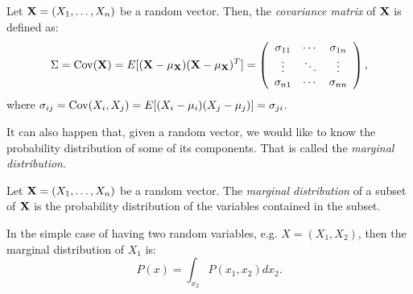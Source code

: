 \begin{ndef}
Let $\mathbf{X} = (X_1,\dots,X_n)$ be a random vector. Then, the \emph{covariance matrix} of $\mathbf{X}$ is defined as:
$$
\Sigma = \operatorname*{Cov}(\mathbf{X}) = E[(\mathbf{X} - \mu_{\mathbf{X}})(\mathbf{X} - \mu_{\mathbf{X}})^T] = \left ( \begin{array}{ccc} 
  \sigma_{11} & \cdots & \sigma_{1n}\\
  \vdots & \ddots & \vdots \\
  \sigma_{n1} & \cdots & \sigma_{nn}
  \end{array} \right ),
$$
where $\sigma_{ij} = \operatorname*{Cov}(X_i,X_j) = E[(X_i - \mu_i)(X_j - \mu_j)] = \sigma_{ji}$.
\end{ndef}


It can also happen that, given a random vector, we would like to know the probability distribution of some of its components. That is called the \emph{marginal distribution}.

\begin{ndef}
Let $\mathbf{X} = (X_1,\dots,X_n)$ be a random vector. The \emph{marginal distribution} of a subset of $\mathbf{X}$ is the probability distribution of the variables contained in the subset. 
\end{ndef}
In the simple case of having two random variables, e.g. $X= (X_1, X_2)$, then the marginal distribution of $X_1$ is:
$$
P(x) = \int_{x_2} P(x_1,x_2) dx_2.
$$

